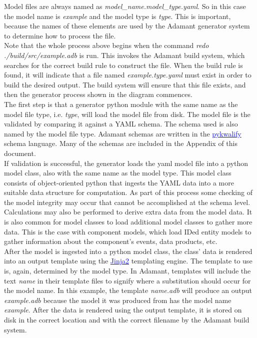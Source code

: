 Model files are always named as \textit{model\_name.model\_type.yaml}. So in this case the model name is \textit{example} and the model type is \textit{type}. This is important, because the names of these elements are used by the Adamant generator system to determine how to process the file. \\

Note that the whole process above begins when the command \textit{redo ./build/src/example.adb} is run. This invokes the Adamant build system, which searches for the correct build rule to construct the file. When the build rule is found, it will indicate that a file named \textit{example.type.yaml} must exist in order to build the desired output. The build system will ensure that this file exists, and then the generator process shown in the diagram commences. \\

The first step is that a generator python module with the same name as the model file type, i.e. \textit{type}, will load the model file from disk. The model file is the validated by comparing it against a YAML schema. The schema used is also named by the model file type. Adamant schemas are written in the \href{https://pykwalify.readthedocs.io/en/unstable/}{\textcolor{blue}{pykwalify}} schema language. Many of the schemas are included in the Appendix of this document. \\

If validation is successful, the generator loads the yaml model file into a python model class, also with the same name as the model type. This model class consists of object-oriented python that ingests the YAML data into a more suitable data structure for computation. As part of this process some checking of the model integrity may occur that cannot be accomplished at the schema level. Calculations may also be performed to derive extra data from the model data. It is also common for model classes to load additional model classes to gather more data. This is the case with component models, which load IDed entity models to gather information about the component's events, data products, etc. \\

After the model is ingested into a python model class, the class' data is rendered into an output template using the \href{http://jinja.pocoo.org}{\textcolor{blue}{Jinja2}} templating engine. The template to use is, again, determined by the model type. In Adamant, templates will include the text \textit{name} in their template files to signify where a substitution should occur for the model name. In this example, the template \textit{name.adb} will produce an output \textit{example.adb} because the model it was produced from has the model name \textit{example}. After the data is rendered using the output template, it is stored on disk in the correct location and with the correct filename by the Adamant build system. \\

